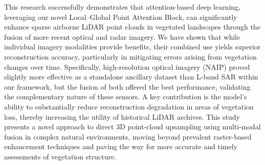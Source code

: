 \documentclass[remotesensing,article,accept,pdftex,moreauthors]{Definitions/mdpi}
\begin{document}
This research successfully demonstrates that attention-based deep learning, leveraging our novel Local--Global Point Attention Block, can significantly enhance sparse airborne LiDAR point clouds in vegetated landscapes through the fusion of more recent optical and radar imagery. We have shown that while individual imagery modalities provide benefits, their combined use yields superior reconstruction accuracy, particularly in mitigating errors arising from vegetation changes over time. Specifically, high-resolution optical imagery (NAIP) proved slightly more effective as a standalone ancillary dataset than L-band SAR within our framework, but the fusion of both offered the best performance, validating the complementary nature of these sensors. A key contribution is the model's ability to substantially reduce reconstruction degradation in areas of vegetation loss, thereby increasing the utility of historical LiDAR archives. This study presents a novel approach to direct 3D point-cloud upsampling using multi-modal fusion in complex natural environments, moving beyond prevalent raster-based enhancement techniques and paving the way for more accurate and timely assessments of vegetation structure.


\vspace{6pt} 


\end{document}
